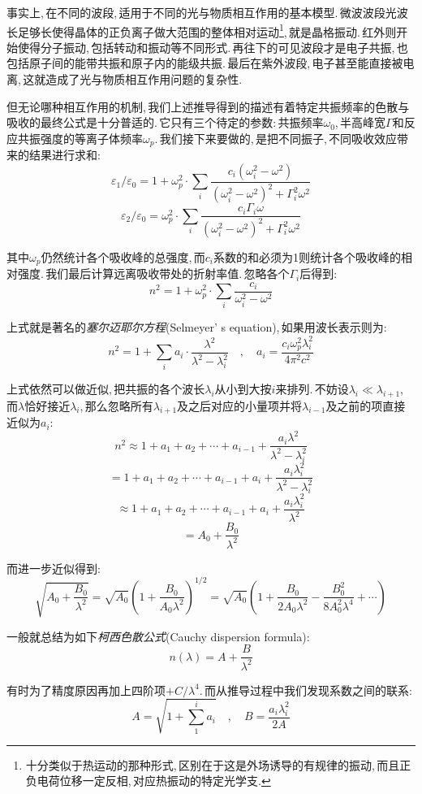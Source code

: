 事实上,\,在不同的波段,\,适用于不同的光与物质相互作用的基本模型.\,微波波段光波长足够长使得晶体的正负离子做大范围的整体相对运动\footnote{十分类似于热运动的那种形式,\,区别在于这是外场诱导的有规律的振动,\,而且正负电荷位移一定反相,\,对应热振动的特定光学支.},\,就是晶格振动.\,红外则开始使得分子振动,\,包括转动和振动等不同形式.\,再往下的可见波段才是电子共振,\,也包括原子间的能带共振和原子内的能级共振.\,最后在紫外波段,\,电子甚至能直接被电离,\,这就造成了光与物质相互作用问题的复杂性.

但无论哪种相互作用的机制,\,我们上述推导得到的描述有着特定共振频率的色散与吸收的最终公式是十分普适的.\,它只有三个待定的参数:\,共振频率$\omega_0$,\,半高峰宽$\Gamma$和反应共振强度的等离子体频率$\omega_p$.\,我们接下来要做的,\,是把不同振子,\,不同吸收效应带来的结果进行求和:
\[\varepsilon_1/\varepsilon_0=1+\omega_p^2\cdot\sum_i\frac{c_i(\omega_i^2-\omega^2)}{(\omega_i^2-\omega^2)^2+\Gamma_i^2\omega^2}\]
\[\varepsilon_2/\varepsilon_0=\omega_p^2\cdot\sum_i\frac{c_i\Gamma_i\omega}{(\omega_i^2-\omega^2)^2+\Gamma_i^2\omega^2}\]

其中$\omega_p$仍然统计各个吸收峰的总强度,\,而$c_i$系数的和必须为1则统计各个吸收峰的相对强度.\,我们最后计算远离吸收带处的折射率值.\,忽略各个$\Gamma_i$后得到:
\[n^2=1+\omega_p^2\cdot\sum_i\frac{c_i}{\omega_i^2-\omega^2}\]

上式就是著名的\emph{塞尔迈耶尔方程}(Selmeyer'
s equation),\,如果用波长表示则为:
\[n^2=1+\sum_i a_i\cdot\frac{\lambda^2}{\lambda^2-\lambda_i^2}\quad,\quad a_i=\frac{c_i\omega_p^2\lambda_i^2}{4\pi^2c^2}\]

上式依然可以做近似,\,把共振的各个波长$\lambda_i$从小到大按$i$来排列.\,不妨设$\lambda_i\ll\lambda_{i+1}$,\,而$\lambda$恰好接近$\lambda_i$,\,那么忽略所有$\lambda_{i+1}$及之后对应的小量项并将$\lambda_{i-1}$及之前的项直接近似为$a_i$:
\[n^2\approx 1+a_1+a_2+\cdots+a_{i-1}+\frac{a_i\lambda^2}{\lambda^2-\lambda_i^2}\]
\[= 1+a_1+a_2+\cdots+a_{i-1}+a_i+\frac{a_i\lambda_i^2}{\lambda^2-\lambda_i^2}\]
\[\approx 1+a_1+a_2+\cdots+a_{i-1}+a_i+\frac{a_i\lambda_i^2}{\lambda^2}\]
\[=A_0+\frac{B_0}{\lambda^2}\]

而进一步近似得到:
\[\sqrt{A_0+\frac{B_0}{\lambda^2}}=\sqrt{A_0}\left(1+\frac{B_0}{A_0\lambda^2}\right)^{1/2}=\sqrt{A_0}\left(1+\frac{B_0}{2A_0\lambda^2}-\frac{B_0^2}{8A_0^2 \lambda^4}+\cdots\right)\]

一般就总结为如下\emph{柯西色散公式}(Cauchy dispersion formula):
\[n(\lambda)=A+\frac{B}{\lambda^2}\]

有时为了精度原因再加上四阶项$+C/\lambda^4$.\,而从推导过程中我们发现系数之间的联系:
\[A=\sqrt{1+\sum_1^i a_i}\quad ,\quad B=\frac{a_i\lambda_i^2}{2A}\]

